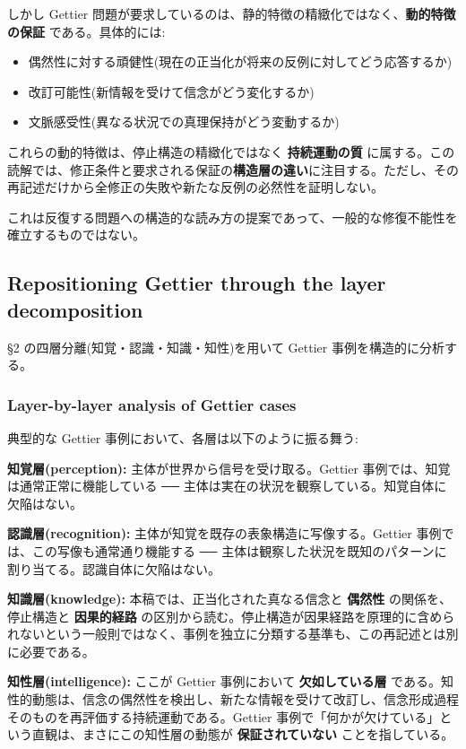 しかし Gettier 問題が要求しているのは、静的特徴の精緻化ではなく、\textbf{動的特徴の保証} である。具体的には:

\begin{itemize}
\item 偶然性に対する頑健性(現在の正当化が将来の反例に対してどう応答するか)
\item 改訂可能性(新情報を受けて信念がどう変化するか)
\item 文脈感受性(異なる状況での真理保持がどう変動するか)
\end{itemize}

これらの動的特徴は、停止構造の精緻化ではなく \textbf{持続運動の質} に属する。この読解では、修正条件と要求される保証の\textbf{構造層の違い}に注目する。ただし、その再記述だけから全修正の失敗や新たな反例の必然性を証明しない。

これは反復する問題への構造的な読み方の提案であって、一般的な修復不能性を確立するものではない。

\subsection{Repositioning Gettier through the layer decomposition}


\S{}2 の四層分離(知覚・認識・知識・知性)を用いて Gettier 事例を構造的に分析する。

\subsubsection{Layer-by-layer analysis of Gettier cases}


典型的な Gettier 事例において、各層は以下のように振る舞う:

\textbf{知覚層(perception):}
主体が世界から信号を受け取る。Gettier 事例では、知覚は通常正常に機能している ── 主体は実在の状況を観察している。知覚自体に欠陥はない。

\textbf{認識層(recognition):}
主体が知覚を既存の表象構造に写像する。Gettier 事例では、この写像も通常通り機能する ── 主体は観察した状況を既知のパターンに割り当てる。認識自体に欠陥はない。

\textbf{知識層(knowledge):}
本稿では、正当化された真なる信念と \textbf{偶然性} の関係を、停止構造と \textbf{因果的経路} の区別から読む。停止構造が因果経路を原理的に含められないという一般則ではなく、事例を独立に分類する基準も、この再記述とは別に必要である。

\textbf{知性層(intelligence):}
ここが Gettier 事例において \textbf{欠如している層} である。知性的動態は、信念の偶然性を検出し、新たな情報を受けて改訂し、信念形成過程そのものを再評価する持続運動である。Gettier 事例で「何かが欠けている」という直観は、まさにこの知性層の動態が \textbf{保証されていない} ことを指している。


